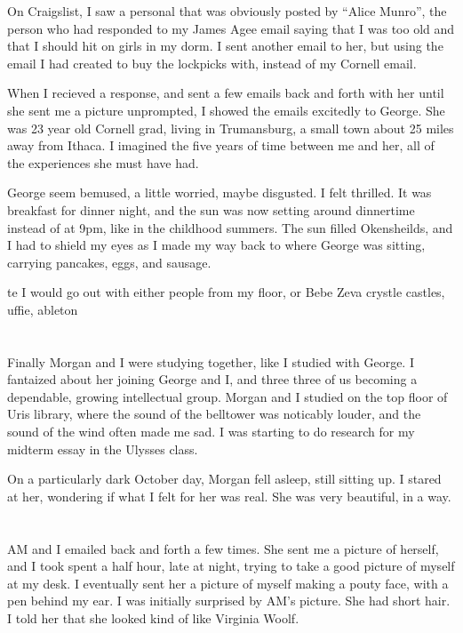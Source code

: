 On Craigslist, I saw a personal that was obviously posted by ``Alice Munro'',
the person who had responded to my James Agee email saying that I was too old
and that I should hit on girls in my dorm.  I sent another email to her, but
using the email I had created to buy the lockpicks with, instead of my Cornell
email.

When I recieved a response, and sent a few emails back and forth with her until
she sent me a picture unprompted, I showed the emails excitedly to George.  She
was 23 year old Cornell grad, living in Trumansburg, a small town about 25 miles
away from Ithaca.  I imagined the five years of time between me and her, all of
the experiences she must have had.

George seem bemused, a little worried, maybe disgusted.  I felt thrilled.  It
was breakfast for dinner night, and the sun was now setting around dinnertime
instead of at 9pm, like in the childhood summers.  The sun filled Okensheilds,
and I had to shield my eyes as I made my way back to where George was sitting,
carrying pancakes, eggs, and sausage. 

te I would go out with either people from my floor, or Bebe Zeva crystle
castles, uffie, ableton

\section{}

Finally Morgan and I were studying together, like I studied with George.  I
fantaized about her joining George and I, and three three of us becoming a
dependable,  growing intellectual group.  Morgan and I studied on the top floor
of Uris library, where the sound of the belltower was noticably louder, and the
sound of the wind often made me sad.  I was starting to do research for my
midterm essay in the Ulysses class.  

On a particularly dark October day, Morgan fell asleep, still sitting up.  I
stared at her, wondering if what I felt for her was real.  She was very
beautiful, in a way.  

\section{}

AM and I emailed back and forth a few times.  She sent me a picture of herself,
and I took spent a half hour, late at night, trying to take a good picture of
myself at my desk.  I eventually sent her a picture of myself making a pouty
face, with a pen behind my ear.  I was initially surprised by AM's picture.  She
had short hair.  I told her that she looked kind of like Virginia Woolf.  


